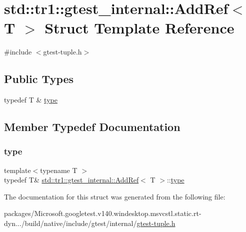 \hypertarget{structstd_1_1tr1_1_1gtest__internal_1_1_add_ref}{}\section{std\+::tr1\+::gtest\+\_\+internal\+::Add\+Ref$<$ T $>$ Struct Template Reference}
\label{structstd_1_1tr1_1_1gtest__internal_1_1_add_ref}


{\ttfamily \#include $<$gtest-\/tuple.\+h$>$}

\subsection*{Public Types}
\begin{DoxyCompactItemize}
\item 
typedef T \& \mbox{\hyperlink{structstd_1_1tr1_1_1gtest__internal_1_1_add_ref_a1e5616e414125574c1653e3a1fc68491}{type}}
\end{DoxyCompactItemize}


\subsection{Member Typedef Documentation}
\mbox{\label{structstd_1_1tr1_1_1gtest__internal_1_1_add_ref_a1e5616e414125574c1653e3a1fc68491}} 
\subsubsection{\texorpdfstring{type}{type}}
{\footnotesize\ttfamily template$<$typename T $>$ \\
typedef T\& \mbox{\hyperlink{structstd_1_1tr1_1_1gtest__internal_1_1_add_ref}{std\+::tr1\+::gtest\+\_\+internal\+::\+Add\+Ref}}$<$ T $>$\+::\mbox{\hyperlink{structstd_1_1tr1_1_1gtest__internal_1_1_add_ref_a1e5616e414125574c1653e3a1fc68491}{type}}}



The documentation for this struct was generated from the following file\+:\begin{DoxyCompactItemize}
\item 
packages/\+Microsoft.\+googletest.\+v140.\+windesktop.\+msvcstl.\+static.\+rt-\/dyn.../build/native/include/gtest/internal/\mbox{\hyperlink{gtest-tuple_8h}{gtest-\/tuple.\+h}}\end{DoxyCompactItemize}
